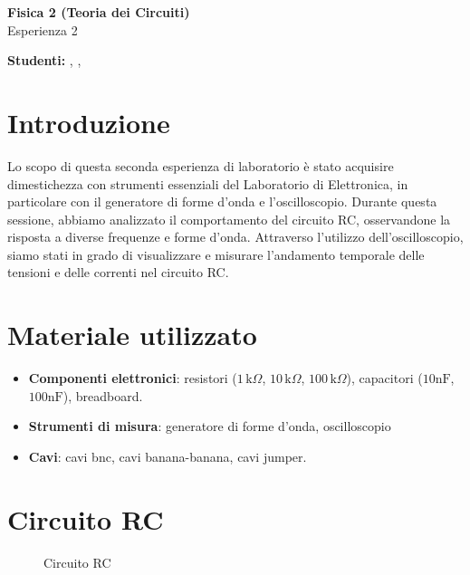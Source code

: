 



\begin{Huge}
\textsf{\textbf{Fisica 2 (Teoria dei Circuiti)}}\\
Esperienza 2
\end{Huge}

\vspace{1ex}

\textsf{\textbf{Studenti:}} ,  , 

\vspace{2ex}

\section{Introduzione}
Lo scopo di questa seconda esperienza di laboratorio è stato acquisire dimestichezza con strumenti essenziali del Laboratorio di Elettronica, in particolare con il generatore di forme d’onda e l’oscilloscopio. Durante questa sessione, abbiamo analizzato il comportamento del circuito RC, osservandone la risposta a diverse frequenze e forme d’onda. Attraverso l’utilizzo dell’oscilloscopio, siamo stati in grado di visualizzare e misurare l’andamento temporale delle tensioni e delle correnti nel circuito RC.

\section{Materiale utilizzato}
\begin{itemize}
    \item \textbf{Componenti elettronici}: resistori (\(1 \, \text{k}\Omega\), \(10 \, \text{k}\Omega\), \(100 \, \text{k}\Omega\)), capacitori (\(10 \text{nF}\), \(100\text{nF}\)), breadboard.
    \item \textbf{Strumenti di misura}: generatore di forme d'onda, oscilloscopio
    \item \textbf{Cavi}: cavi bnc, cavi banana-banana, cavi jumper.
\end{itemize}

\section{Circuito RC}
\begin{figure}[!ht]
\centering
{}%
\caption{Circuito RC}
\end{figure}

